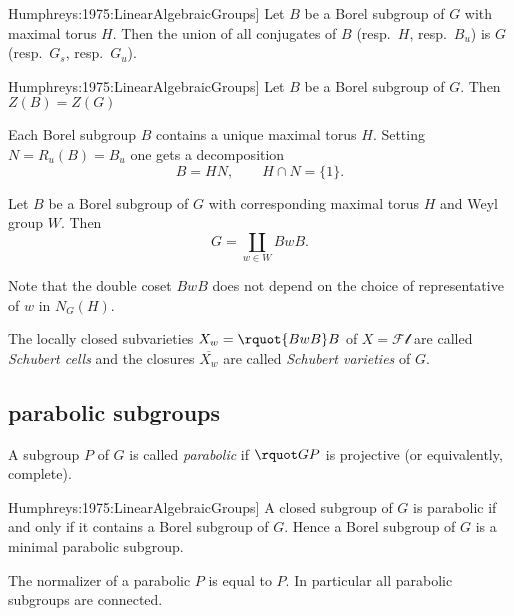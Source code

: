 \documentclass[english, no-theorem-numbers]{short-notes}
\newcommand\Humph[1]{\cite[#1]{Humphreys:1975:LinearAlgebraicGroups}}
\begin{document}
\begin{Thm}[\Humph{Thm~22.2}]
    Let $B$ be a Borel subgroup of $G$ with maximal torus $H$.
    Then the union of all conjugates of $B$ (resp.~$H$, resp.~$B_u$) is $G$ (resp.~$G_s$, resp.~$G_u$).
\end{Thm}

\begin{Prop}[\Humph{Cor.~22.2B}]
    Let $B$ be a Borel subgroup of $G$.
    Then $Z(B) = Z(G)$
\end{Prop}

Each Borel subgroup $B$ contains a unique maximal torus $H$.
Setting $N = R_u(B) = B_u$ one gets a decomposition
\[
    B = HN, \qquad H∩N = \{1\}.
\]

\begin{Thm}
    Let $B$ be a Borel subgroup of $G$ with corresponding maximal torus $H$ and Weyl group $W$.
    Then
    \[
        G = \coprod_{w ∈ W} BwB.
    \]
\end{Thm}

Note that the double coset $BwB$ does not depend on the choice of representative of $w$ in $N_G(H)$.

\begin{Def}
    The locally closed subvarieties $X_w = \rquot{BwB}B$ of $X = \mathcal{Fl}$ are called \emph{Schubert cells} and the closures $\overline{X_w}$ are called \emph{Schubert varieties} of $G$.
\end{Def}

\subsection*{parabolic subgroups}

\begin{Def}
    A subgroup $P$ of $G$ is called \emph{parabolic} if $\rquot GP$ is projective (or equivalently, complete).
\end{Def}

\begin{Prop}[\Humph{Cor.~21.3B}]
    A closed subgroup of $G$ is parabolic if and only if it contains a Borel subgroup of $G$.
    Hence a Borel subgroup of $G$ is a minimal parabolic subgroup.
\end{Prop}

\begin{Prop}
    The normalizer of a parabolic $P$ is equal to $P$. 
    In particular all parabolic subgroups are connected.
\end{Prop}
\end{document}

